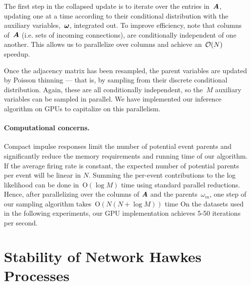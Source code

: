 The first step in the collapsed update is to iterate over the
entries in~$\boldsymbol{A}$, updating one at a time according to their
conditional distribution with the auxiliary variables,~$\boldsymbol{\omega}$,
integrated out. To improve efficiency, note that columns of~$\boldsymbol{A}$
(i.e. sets of incoming connections), are conditionally
independent of one another. This allows us to parallelize over
columns and achieve an~$\mathcal{O}(N)$ speedup.

Once the adjacency matrix has been resampled, the parent variables
are updated by Poisson thinning --- that is, by sampling from their
discrete conditional distribution. Again, these are all conditionally
independent, so the~$M$ auxiliary variables can be sampled in parallel.
We have implemented our inference algorithm on GPUs to capitalize
on this parallelism.


\paragraph{Computational concerns.}
Compact impulse responses limit the number of potential event parents
and significantly reduce the memory requirements and running time of
our algorithm. If the average firing rate is constant, the expected
number of potential parents per event will be linear in $N$. Summing
the per-event contributions to the log likelihood can be done
in~${\mathrm{O}(\log M)}$ time using standard parallel
reductions. Hence, after parallelizing over the columns of $\boldsymbol{A}$ and
the parents~$\omega_m$, one step of our sampling algorithm
takes~${\mathrm{O}(N(N+\log M))}$ time
On the datasets used in the following experiments, our GPU
implementation
achieves 5-50 iterations per second.

\section{Stability of Network Hawkes Processes}
\label{sec:stability}

